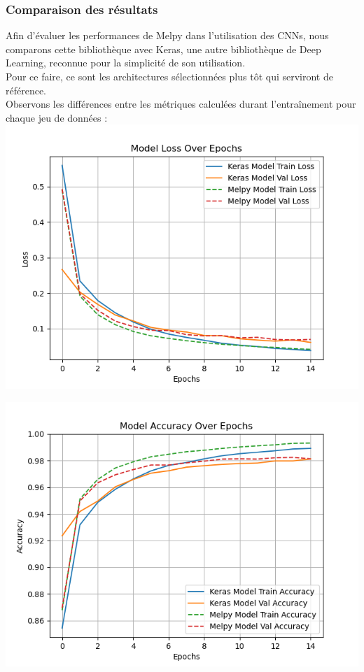 \begin{multicols}{2}
\subsubsection{Comparaison des résultats}

Afin d’évaluer les performances de Melpy dans l’utilisation des CNNs, nous comparons cette bibliothèque avec Keras, une autre bibliothèque de Deep Learning, reconnue pour la simplicité de son utilisation. \\

Pour ce faire, ce sont les architectures sélectionnées plus tôt qui serviront de référence.\\

Observons les différences entre les métriques calculées durant l’entraînement pour chaque jeu de données : \\

\includegraphics[width=\columnwidth]{images/mnist_loss_comparison.png}
\hfill\break

\includegraphics[width=\columnwidth]{images/mnist_accuracy_comparison.png}
\hfill\break


\end{multicols}
